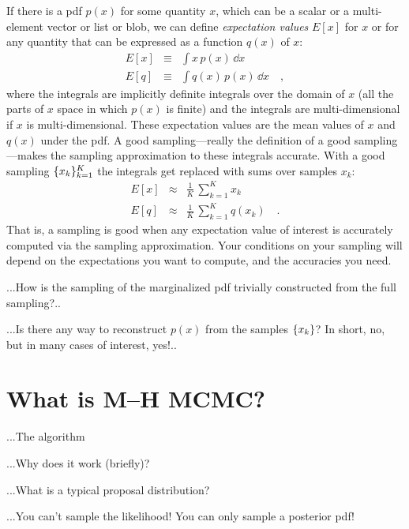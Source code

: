 \documentclass[12pt,twoside,pdftex]{article}
\begin{document}
If there is a pdf $p(x)$ for some quantity $x$, which can be a scalar
or a multi-element vector or list or blob, we can define
\emph{expectation values} $E[x]$ for $x$ or for any quantity that can
be expressed as a function $q(x)$ of $x$:
\begin{eqnarray}
E[x] &\equiv& \int x\,p(x)\,\dd x
\\
E[q] &\equiv& \int q(x)\,p(x)\,\dd x
\quad ,
\end{eqnarray}
where the integrals are implicitly definite integrals over the domain
of $x$ (all the parts of $x$ space in which $p(x)$ is finite) and the
integrals are multi-dimensional if $x$ is multi-dimensional.  These
expectation values are the mean values of $x$ and $q(x)$ under the
pdf.  A good sampling---really the definition of a good
sampling---makes the sampling approximation to these integrals
accurate.  With a good sampling $\{{x_k}\}_{k=1}^K$ the integrals
get replaced with sums over samples $x_k$:
\begin{eqnarray}
E[x] &\approx& \frac{1}{K}\,\sum_{k=1}^K x_k
\\
E[q] &\approx& \frac{1}{K}\,\sum_{k=1}^K q(x_k)
\quad .
\end{eqnarray}
That is, a sampling is good when any expectation value of interest is
accurately computed via the sampling approximation.  Your conditions
on your sampling will depend on the expectations you want to compute,
and the accuracies you need.

...How is the sampling of the marginalized pdf trivially constructed from the full sampling?..

...Is there any way to reconstruct $p(x)$ from the samples
$\{{x_k}\}$?  In short, no, but in many cases of interest, yes!..

\section{What is M--H MCMC?}

...The algorithm

...Why does it work (briefly)?

...What is a typical proposal distribution?

...You can't sample the likelihood!  You can only sample a posterior
pdf!

%
%
\end{document}
